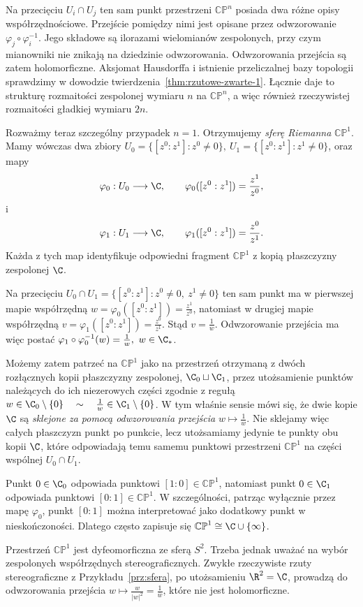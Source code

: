 \begin{przyklad}
Na przecięciu $U_i\cap U_j$ ten sam punkt przestrzeni
$\mathbb{CP}^n$ posiada dwa różne opisy współrzędnościowe.
Przejście pomiędzy nimi jest opisane przez odwzorowanie $\varphi_j\circ\varphi_i^{-1}$.
Jego składowe są ilorazami wielomianów zespolonych, przy czym
mianowniki nie znikają na dziedzinie odwzorowania. Odwzorowania
przejścia są zatem holomorficzne. Aksjomat Hausdorffa i istnienie
przeliczalnej bazy topologii sprawdzimy w dowodzie
twierdzenia~\ref{thm:rzutowe-zwarte-1}. Łącznie daje to strukturę
rozmaitości zespolonej wymiaru $n$ na $\mathbb{CP}^n$, a więc również
rzeczywistej rozmaitości gładkiej wymiaru $2n$.

Rozważmy teraz szczególny przypadek $n=1$. Otrzymujemy
\emph{sferę Riemanna} $\mathbb{CP}^1$.
Mamy wówczas dwa zbiory $U_0=\{[z^0:z^1]:z^0\neq0\}, \ U_1=\{[z^0:z^1]:z^1\neq0\}$,
oraz mapy
\[
\varphi_0:U_0\longrightarrow\C,
\qquad
\varphi_0([z^0:z^1])=\frac{z^1}{z^0},
\]
i
\[
\varphi_1:U_1\longrightarrow\C,
\qquad
\varphi_1([z^0:z^1])=\frac{z^0}{z^1}.
\]
Każda z tych map identyfikuje odpowiedni fragment
$\mathbb{CP}^1$ z kopią płaszczyzny zespolonej $\C$.

Na przecięciu $U_0\cap U_1 = \{[z^0:z^1]:z^0\neq0,\ z^1\neq0\}$
ten sam punkt ma w pierwszej mapie współrzędną $w = \varphi_0([z^0:z^1]) = \frac{z^1}{z^0}$,
natomiast w drugiej mapie współrzędną $v = \varphi_1([z^0:z^1]) = \frac{z^0}{z^1}$.
Stąd $v=\frac1w$.
Odwzorowanie przejścia ma więc postać $\varphi_1\circ\varphi_0^{-1}(w) = \frac1w, \ w\in\C_*$.

Możemy zatem patrzeć na $\mathbb{CP}^1$ jako na przestrzeń otrzymaną
z dwóch rozłącznych kopii płaszczyzny zespolonej, $\C_0\sqcup\C_1$,
przez utożsamienie punktów należących do ich niezerowych części zgodnie
z regułą $w\in\C_0\setminus\{0\} \quad\sim\quad \frac1w\in\C_1\setminus\{0\}$.
W tym właśnie sensie mówi się, że dwie kopie $\C$ są
\emph{sklejone za pomocą odwzorowania przejścia} $w\longmapsto\frac1w$.
Nie sklejamy więc całych płaszczyzn punkt po punkcie, lecz utożsamiamy
jedynie te punkty obu kopii $\C$, które odpowiadają temu samemu punktowi
przestrzeni $\mathbb{CP}^1$ na części wspólnej $U_0\cap U_1$.

Punkt $0\in\C_0$ odpowiada punktowi $[1:0]\in\mathbb{CP}^1$,
natomiast punkt $0\in\C_1$ odpowiada punktowi $[0:1]\in\mathbb{CP}^1$.
W szczególności, patrząc wyłącznie przez mapę $\varphi_0$, punkt
$[0:1]$ można interpretować jako dodatkowy punkt w nieskończoności.
Dlatego często zapisuje się $\mathbb{CP}^1 \cong \C\cup\{\infty\}$.

Przestrzeń $\mathbb{CP}^1$ jest dyfeomorficzna ze sferą $S^2$.
Trzeba jednak uważać na wybór zespolonych współrzędnych
stereograficznych. Zwykłe rzeczywiste rzuty stereograficzne z
Przykładu~\ref{prz:sfera}, po utożsamieniu $\R^2=\C$, prowadzą do
odwzorowania przejścia $w\longmapsto\frac{w}{|w|^2} = \frac1{\overline{w}}$,
które nie jest holomorficzne.


\end{przyklad}
